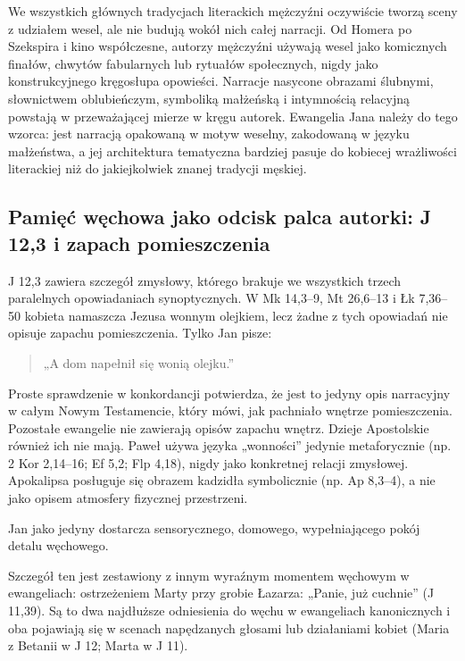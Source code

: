 We wszystkich głównych tradycjach literackich mężczyźni oczywiście tworzą sceny z udziałem wesel, ale nie budują wokół nich całej narracji.
Od Homera po Szekspira i kino współczesne, autorzy mężczyźni używają wesel jako komicznych finałów, chwytów fabularnych lub rytuałów społecznych, nigdy jako konstrukcyjnego kręgosłupa opowieści.
Narracje nasycone obrazami ślubnymi, słownictwem oblubieńczym, symboliką małżeńską i intymnością relacyjną powstają w przeważającej mierze w kręgu autorek.
Ewangelia Jana należy do tego wzorca:
jest narracją opakowaną w motyw weselny, zakodowaną w języku małżeństwa, a jej architektura tematyczna bardziej pasuje do kobiecej wrażliwości literackiej niż do jakiejkolwiek znanej tradycji męskiej.

\subsection{Pamięć węchowa jako odcisk palca autorki: J 12,3 i zapach pomieszczenia}\label{subsec:the-anointing-of-jesus-by-a-woman-with-expensive-perfume-john-123-mark-143-9}

J 12,3 zawiera szczegół zmysłowy, którego brakuje we wszystkich trzech paralelnych opowiadaniach synoptycznych.
W Mk 14,3--9, Mt 26,6--13 i Łk 7,36--50 kobieta namaszcza Jezusa wonnym olejkiem, lecz żadne z tych opowiadań nie opisuje zapachu pomieszczenia.
Tylko Jan pisze:

\begin{quote}
„A dom napełnił się wonią olejku.”
\end{quote}

Proste sprawdzenie w konkordancji potwierdza, że jest to jedyny opis narracyjny w całym Nowym Testamencie, który mówi, jak pachniało wnętrze pomieszczenia.
Pozostałe ewangelie nie zawierają opisów zapachu wnętrz.
Dzieje Apostolskie również ich nie mają.
Paweł używa języka „wonności” jedynie metaforycznie (np. 2 Kor 2,14--16; Ef 5,2; Flp 4,18), nigdy jako konkretnej relacji zmysłowej.
Apokalipsa posługuje się obrazem kadzidła symbolicznie (np. Ap 8,3--4), a nie jako opisem atmosfery fizycznej przestrzeni.

Jan jako jedyny dostarcza sensorycznego, domowego, wypełniającego pokój detalu węchowego.

Szczegół ten jest zestawiony z innym wyraźnym momentem węchowym w ewangeliach:
ostrzeżeniem Marty przy grobie Łazarza: „Panie, już cuchnie” (J 11,39).
Są to dwa najdłuższe odniesienia do węchu w ewangeliach kanonicznych i oba pojawiają się w scenach napędzanych głosami lub działaniami kobiet (Maria z Betanii w J 12; Marta w J 11).

